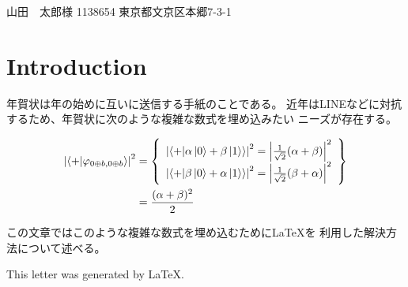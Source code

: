 \documentclass{jletteraddress}
\newcommand{\ket}[1]{\mathinner{\left|{#1}\right\rangle}}
\newcommand{\braket}[2]{\mathinner{\left\langle{#1}\middle|#2\right\rangle}}
\begin{document}
\pagestyle{empty}

\addaddress
  {山田　太郎}{様}
  {1138654}
  {東京都文京区本郷7-3-1}
  {}

\newpage
{}

\begin{abstract}
  \footnotesize
  この文章では、新年の挨拶を述べるための手紙である``年賀状''を作る方法について述べる。
  従来の年賀状を作成するソフトウェアは数式やソースコードの埋め込みが貧弱であったが、
  我々はそれを解決す方法として組版ソフト\LaTeX を利用する方法を示す。

  In this paper, we describe how to make a letter to hello new year.
  For conventional softwares that makes those letter,
  it's difficult to write mathmatical expressions or
  programming source code.
  We show how we solve that problem with \LaTeX.
\end{abstract}

\section*{Introduction}

年賀状は年の始めに互いに送信する手紙のことである。
近年はLINEなどに対抗するため、年賀状に次のような複雑な数式を埋め込みたい
ニーズが存在する。

{\scriptsize
\begin{align*}
  \left|\braket{+}{\varphi_{0 \oplus b, 0 \oplus b}}\right|^2 &= \left\{
\begin{array}{l}
\left|\braket{+}{\alpha\ket{0} + \beta\ket{1}}\right|^2 = \left|\frac{1}{\sqrt{2}}(\alpha + \beta)\right|^2 \\
\left|\braket{+}{\beta\ket{0} + \alpha\ket{1}}\right|^2 = \left|\frac{1}{\sqrt{2}}(\beta + \alpha)\right|^2
\end{array}
\right\} \\
&= \frac{(\alpha + \beta)^2}{2}
\end{align*}
}

\noindent
この文章ではこのような複雑な数式を埋め込むために\LaTeX を
利用した解決方法について述べる。

\begin{flushright}
  \tiny This letter was generated by \LaTeX.
\end{flushright}
\end{document}
